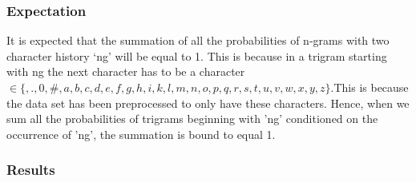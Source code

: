 \documentclass[12pt]{article}
\begin{document}
\subsubsection{Expectation}
It is expected that the summation of all the probabilities of n-grams with two character history `ng' will be equal to 1. This is because in a trigram starting with ng the next character has to be a character $\in \{ ,.,0,\#,a,b,c,d,e,f,g,h,i,k,l,m,n,o,p,q,r,s,t,u,v,w,x,y,z\}. $This is because the data set has been preprocessed to only have these characters. Hence, when we sum all the probabilities of trigrams beginning with 'ng' conditioned on the occurrence of 'ng', the summation is bound to equal 1.  
\subsubsection{Results}
\end{document}
